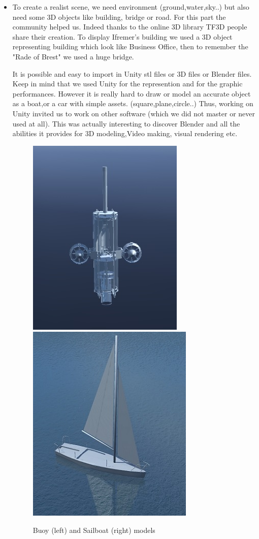 \documentclass[a4paper]{report}
\begin{document}
\begin{itemize}
\item To create a realist scene, we need environment (ground,water,sky..) but also need some 3D objects like building, bridge or road. For this part the community helped us. Indeed thanks to the online 3D library TF3D people share their creation. To display Ifremer's building we used a 3D object representing building which look like Business Office, then to remember the "Rade of Brest" we used a huge bridge.

It is possible and easy to import in Unity stl files or 3D files or Blender files. Keep in mind that we used Unity for the represention and for the graphic performances. However it is really hard to draw or model an accurate object as a boat,or a car with simple assets. (square,plane,circle..) Thus, working on Unity invited us to work on other software (which we did not master or never used at all). This was actually interesting to discover Blender and all the abilities it provides for 3D modeling,Video making, visual rendering etc.




\begin{figure}[H]
	\centering
    \caption{Buoy (left) and Sailboat (right) models}
    \includegraphics[scale=0.6]{image/buoy.jpg}
    \includegraphics[scale=0.6]{image/Sailboat.jpg}
	\end{figure}
    

\end{itemize}
\end{document}
